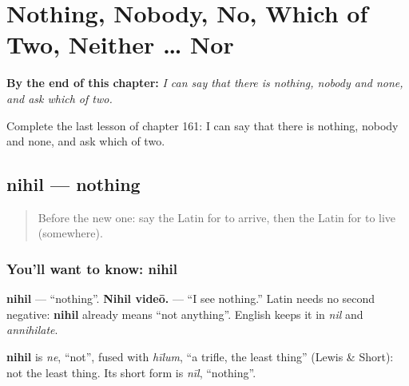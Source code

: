 
\chapter{Nothing, Nobody, No, Which of Two, Neither … Nor}
\label{ch:la-nothing-nobody-no-which-of-two-neither-nor}

\begin{chapteropening}
\textbf{By the end of this chapter:} \emph{I can say that there is nothing, nobody and none, and ask which of two.}

Complete the last lesson of chapter 161: I can say that there is nothing, nobody and none, and ask which of two.
\end{chapteropening}

\section[nihil]{nihil — nothing}

\label{lesson:LA-C161-nihil}



\begin{quote}
Before the new one: say the Latin for to arrive, then the Latin for to live (somewhere).
\end{quote}

\subsection*{You'll want to know: nihil}
\textbf{nihil} — \textquotedblleft{}nothing\textquotedblright{}. \textbf{Nihil videō.} — \textquotedblleft{}I see nothing.\textquotedblright{} Latin needs no second negative: \textbf{nihil} already means \textquotedblleft{}not anything\textquotedblright{}. English keeps it in \emph{nil} and \emph{annihilate}.

\begin{cousinweb}
\textbf{nihil} is \emph{ne}, \textquotedblleft{}not\textquotedblright{}, fused with \emph{hīlum}, \textquotedblleft{}a trifle, the least thing\textquotedblright{} (Lewis \& Short): not the least thing. Its short form is \emph{nīl}, \textquotedblleft{}nothing\textquotedblright{}.
\end{cousinweb}

